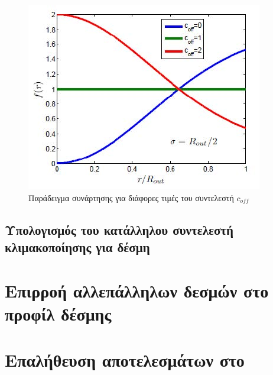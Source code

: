 \begin{figure}[tph]
\includegraphics{figures/CST_gauss_function_for_coff}
\centering
\caption{Παράδειγμα  συνάρτησης για διάφορες τιμές του συντελεστή $c_{off}$}
\label{fig:CST_gauss_coff}
\end{figure}

\subsection{Υπολογισμός του κατάλληλου συντελεστή κλιμακοποίησης για  δέσμη}

\section{Επιρροή αλλεπάλληλων δεσμών στο προφίλ δέσμης}

\section{Επαλήθευση αποτελεσμάτων στο }

